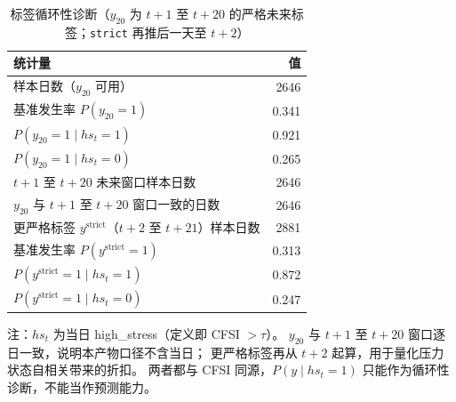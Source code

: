 \begin{table}[t]
\centering
\caption{标签循环性诊断（$y_{20}$ 为 $t+1$ 至 $t+20$ 的严格未来标签；\texttt{strict} 再推后一天至 $t+2$）}
\label{tab:circularity}
\footnotesize
\begin{tabular}{lr}
\toprule
统计量 & 值 \\
\midrule
样本日数（$y_{20}$ 可用） & 2646 \\
基准发生率 $P(y_{20}=1)$ & 0.341 \\
$P(y_{20}=1\mid hs_t=1)$ & 0.921 \\
$P(y_{20}=1\mid hs_t=0)$ & 0.265 \\
$t+1$ 至 $t+20$ 未来窗口样本日数 & 2646 \\
$y_{20}$ 与 $t+1$ 至 $t+20$ 窗口一致的日数 & 2646 \\
更严格标签 $y^{\mathrm{strict}}$（$t+2$ 至 $t+21$）样本日数 & 2881 \\
基准发生率 $P(y^{\mathrm{strict}}=1)$ & 0.313 \\
$P(y^{\mathrm{strict}}=1\mid hs_t=1)$ & 0.872 \\
$P(y^{\mathrm{strict}}=1\mid hs_t=0)$ & 0.247 \\
\bottomrule
\end{tabular}
\par\smallskip
\raggedright\scriptsize
注：$hs_t$ 为当日 high\_stress（定义即 CFSI $>\tau$）。
$y_{20}$ 与 $t+1$ 至 $t+20$ 窗口逐日一致，说明本产物口径不含当日；
更严格标签再从 $t+2$ 起算，用于量化压力状态自相关带来的折扣。
两者都与 CFSI 同源，$P(y\mid hs_t=1)$ 只能作为循环性诊断，不能当作预测能力。
\end{table}

